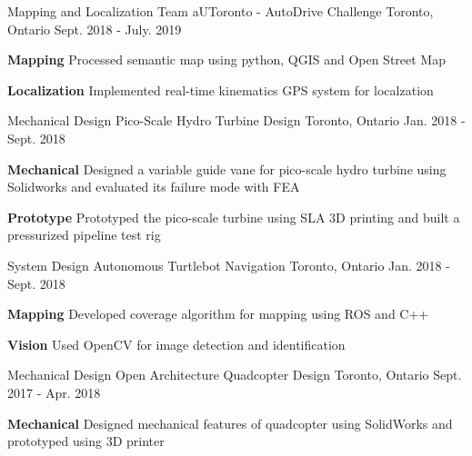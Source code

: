 \begin{cventries}
	\cventry
	{Mapping and Localization Team}
	{aUToronto - AutoDrive Challenge}
	{Toronto, Ontario}
	{Sept. 2018 - July. 2019}
	{
		\begin{cvitems}
			\item {\textbf{Mapping} Processed semantic map using python, QGIS and Open Street Map}
			\item {\textbf{Localization} Implemented real-time kinematics GPS system for localzation}
		\end{cvitems}
	}
	\cventry
	{Mechanical Design}
	{Pico-Scale Hydro Turbine Design}
	{Toronto, Ontario}
	{Jan. 2018 - Sept. 2018}
	{
		\begin{cvitems}
			\item {\textbf{Mechanical} Designed a variable guide vane for pico-scale hydro turbine using Solidworks and evaluated its failure mode with FEA}
			\item {\textbf{Prototype} Prototyped the pico-scale turbine using SLA 3D printing and built a pressurized pipeline test rig}
		\end{cvitems}
	}
	\cventry
	{System Design}
	{Autonomous Turtlebot Navigation}
	{Toronto, Ontario}
	{Jan. 2018 - Sept. 2018}
	{
		\begin{cvitems}
			\item {\textbf{Mapping} Developed coverage algorithm for mapping using ROS and C++}
			\item {\textbf{Vision} Used OpenCV for image detection and identification}
		\end{cvitems}
	}
	\cventry
	{Mechanical Design}
	{Open Architecture Quadcopter Design}
	{Toronto, Ontario}
	{Sept. 2017 - Apr. 2018}
	{
		\begin{cvitems}
			\item {\textbf{Mechanical} Designed mechanical features of quadcopter using SolidWorks and prototyped using 3D printer}

\end{cvitems}}
\end{cventries}
